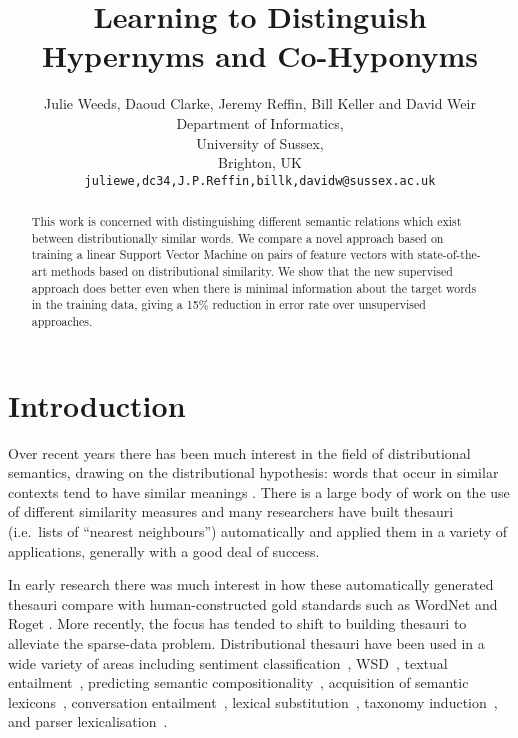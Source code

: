 \documentclass[11pt]{article}
\title{Learning to Distinguish Hypernyms and Co-Hyponyms}
\author{Julie Weeds, Daoud Clarke, Jeremy Reffin, Bill Keller and David Weir\\ Department of Informatics,\\ University of Sussex,\\ Brighton, UK\\ {\tt juliewe,dc34,J.P.Reffin,billk,davidw@sussex.ac.uk}}
\date{} %
\begin{document}
\maketitle

\begin{abstract}
This work is concerned with distinguishing different semantic relations which exist between distributionally similar words.  We compare a novel approach based on training a linear Support Vector Machine on pairs of feature vectors with state-of-the-art methods based on distributional similarity. We show that the new supervised approach does better even when there is minimal information about the target words in the training data, giving a 15\% reduction in error rate over unsupervised approaches.

\end{abstract}
\section{Introduction}

Over recent years there has been much interest in the field of distributional semantics, drawing on the distributional hypothesis: words that occur in similar contexts tend to have similar meanings \cite{Harris1954}.   There is a large body of work on the use of different similarity measures \cite{Lee1999,Weeds2003,Curran2004} and many researchers have built thesauri (i.e.~lists of ``nearest neighbours'') automatically and applied them in a variety of applications, generally with a good deal of success.

In early research there was much interest in how these automatically generated thesauri compare with human-constructed gold standards such as WordNet and Roget \cite{Lin1998,Kilgarriff2000}.  More recently, the focus has tended to shift to building thesauri to alleviate the sparse-data problem.  Distributional thesauri have been used in a wide variety of areas including sentiment classification~\cite{Bollegala2011}, WSD~\cite{miller-EtAl:2012:PAPERS,khapra-EtAl:2010:ACL}, textual entailment~\cite{berant-dagan-goldberger:2010:ACL}, predicting semantic compositionality~\cite{bergsma-EtAl:2010:EMNLP}, acquisition of semantic lexicons~\cite{mcintosh:2010:EMNLP}, conversation entailment~\cite{zhang-chai:2010:EMNLP}, lexical substitution~\cite{szarvas-biemann-gurevych:2013:NAACL-HLT}, taxonomy induction~\cite{fountain-lapata:2012:NAACL-HLT}, and parser lexicalisation~\cite{rei-briscoe:2013:NAACL-HLT}.  
\end{document}
